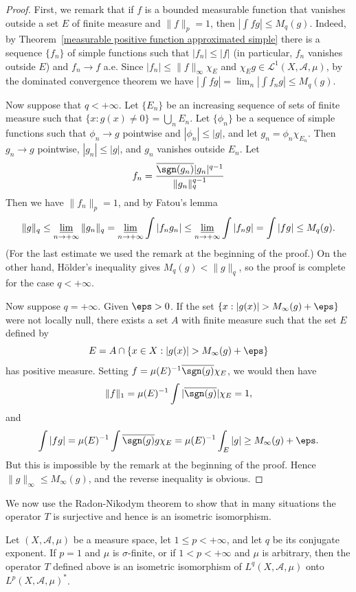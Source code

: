 \begin{proof}
First, we remark that if $f$ is a bounded measurable function that vanishes outside a set $E$ of finite measure and $\|f\|_p=1$, then $|\int fg|\leq M_q(g)$. Indeed, by Theorem~\ref{measurable positive function approximated simple} there is a sequence $\{f_n\}$ of simple functions such that $|f_n|\leq |f|$ (in particular, $f_n$ vanishes outside $E$) and $f_n\to f$ a.e. Since $|f_n|\leq\|f\|_\infty\chi_E$ and $\chi_Eg\in\mathcal{L}^1(X,\mathcal{A},\mu)$, by the dominated convergence theorem we have $|\int fg|=\lim_n|\int f_ng|\leq M_q(g)$.\par
Now suppose that $q<+\infty$. Let $\{E_n\}$ be an increasing sequence of sets of finite measure such that $\{x:g(x)\neq 0\}=\bigcup_nE_n$. Let $\{\phi_n\}$ be a sequence of simple functions such that $\phi_n\to g$ pointwise and $|\phi_n|\leq|g|$, and let $g_n=\phi_n\chi_{E_n}$. Then $g_n\to g$ pointwise, $|g_n|\leq|g|$, and $g_n$ vanishes outside $E_n$. Let
\[f_n=\frac{\overline{\sgn(g_n)}|g_n|^{q-1}}{\|g_n\|_q^{q-1}}\]
Then we have $\|f_n\|_p=1$, and by Fatou's lemma
\[\|g\|_q\leq\varliminf_{n\to+\infty}\|g_n\|_q=\varliminf_{n\to+\infty}\int|f_ng_n|\leq\varliminf_{n\to+\infty}\int|f_ng|=\int|fg|\leq M_q(g).\]
(For the last estimate we used the remark at the beginning of the proof.) On the other hand, H\"older's inequality gives $M_q(g)<\|g\|_q$, so the proof is complete for the case $q<+\infty$.\par
Now suppose $q=+\infty$. Given $\eps>0$. If the set $\{x:|g(x)|>M_\infty(g)+\eps\}$ were not locally null, there exists a set $A$ with finite measure such that the set $E$ defined by 
\[E=A\cap\{x\in X:|g(x)|>M_\infty(g)+\eps\}\]
has positive measure. Setting $f=\mu(E)^{-1}\overline{\sgn(g)}\chi_E$, we would then have
\[\|f\|_1=\mu(E)^{-1}\int|\overline{\sgn(g)}|\chi_E=1,\]
and
\[\int|fg|=\mu(E)^{-1}\int\overline{\sgn(g)}g\chi_E=\mu(E)^{-1}\int_E|g|\geq M_\infty(g)+\eps.\]
But this is impossible by the remark at the beginning of the proof. Hence $\|g\|_\infty\leq M_\infty(g)$, and the reverse inequality is obvious.
\end{proof}
We now use the Radon-Nikodym theorem to show that in many situations the operator $T$ is surjective and hence is an isometric isomorphism.
\begin{theorem}\label{L^p dual space is L^q}
Let $(X,\mathcal{A},\mu)$ be a measure space, let $1\leq p<+\infty$, and let $q$ be its conjugate exponent. If $p=1$ and $\mu$ is $\sigma$-finite, or if $1<p<+\infty$ and $\mu$ is arbitrary, then the operator $T$ defined above is an isometric isomorphism of $L^q(X,\mathcal{A},\mu)$ onto $L^p(X,\mathcal{A},\mu)^*$.
\end{theorem}
